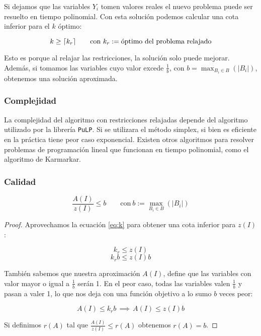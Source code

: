 Si dejamos que las variables $Y_i$ tomen valores reales el nuevo problema puede
ser resuelto en tiempo polinomial. Con esta solución podemos calcular una cota
inferior para el $k$ óptimo:

\begin{equation}
    \label{eq:k}
    k \ge \lceil k_r\rceil \qquad \text{con} \ k_r := \text{óptimo del problema
    relajado}
\end{equation}

Esto es porque al relajar las restricciones, la solución solo puede mejorar.
Además, si tomamos las variables cuyo valor excede $\frac{1}{b}$, con $b =
\max_{B_i \in B}(|B_i|)$, obtenemos una solución aproximada.

\subsubsection{Complejidad}

La complejidad del algoritmo con restricciones relajadas depende del algoritmo
utilizado por la librería \texttt{PuLP}. Si se utilizara el método simplex, si
bien es eficiente en la práctica tiene peor caso exponencial. Existen otros
algoritmos para resolver problemas de programación lineal que funcionan en
tiempo polinomial, como el algoritmo de Karmarkar.

\subsubsection{Calidad}

\[ \frac{A(I)}{z(I)} \le b \qquad \text{con} \ b := \max_{B_i \in B}(|B_i|) \]

\newpage

\begin{proof}

    Aprovechamos la ecuación \eqref{eq:k} para obtener una cota inferior para
    $z(I)$:

    \[ k_r \le z(I) \]
    \[ k_r b \le z(I) b \]

    También sabemos que nuestra aproximación $A(I)$, define que las variables
    con valor mayor o igual a $\frac{1}{b}$ serán 1. En el peor caso, todas las
    variables valen $\frac{1}{b}$ y pasan a valer 1, lo que nos deja con una
    función objetivo a lo sumo $b$ veces peor:

    \[ A(I) \le k_r b \, \implies \, A(I) \le z(I) b \]

    Si definimos $r(A)$ tal que $\frac{A(I)}{z(I)} \le r(A)$ obtenemos $r(A) =
    b$.
\end{proof}
